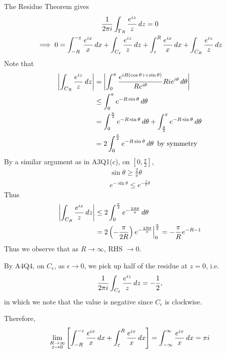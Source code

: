 \documentclass[11pt, oneside]{book}
\begin{document}
\begin{ex}
  The Residue Theorem gives
  \begin{gather*}
    \frac{1}{2 \pi i} \int_{\Gamma_R} \frac{e^{iz}}{z} \mathop{}\!d{z} = 0 \\
    \implies 0 = \int_{-R}^{-\varepsilon} \frac{e^{ix}}{x} \mathop{}\!d{x} + \int_{C_\varepsilon} \frac{e^{iz}}{z} \mathop{}\!d{z} + \int_{\varepsilon}^{R} \frac{e^{ix}}{x} \mathop{}\!d{x} + \int_{C_R} \frac{e^{iz}}{z} \mathop{}\!d{z} 
  \end{gather*}
  Note that
  \begin{align*}
    \left|\int_{C_R} \frac{e^{iz}}{z} \mathop{}\!d{z} \right|
      &= \left|\int_{0}^{\pi} \frac{e^{iR(\cos \theta + i \sin \theta)}}{Re^{i \theta}} Rie^{i \theta} \mathop{}\!d{\theta} \right| \\
      &\leq \int_{0}^{\pi} e^{-R \sin \theta} \mathop{}\!d{\theta}  \\
      &= \int_{0}^{\frac{\pi}{2}} e^{-R \sin \theta} \mathop{}\!d{\theta} + \int_{\frac{\pi}{2}}^{\pi} e^{-R \sin \theta} \mathop{}\!d{\theta} \\
      &= 2 \int_{0}^{\frac{\pi}{2}} e^{-R \sin \theta} \mathop{}\!d{\theta} \enspace \text{by symmetry} 
  \end{align*}
  By a similar argument as in A3Q1(c), on $[0, \frac{\pi}{2} ]$,
  \begin{gather*}
    \sin \theta \geq \frac{2}{\pi} \theta \\
    e^{- \sin \theta} \leq e^{- \frac{2}{\pi} \theta}
  \end{gather*}
  Thus
  \begin{align*}
    \left|\int_{C_R} \frac{e^{iz}}{z} \mathop{}\!d{z} \right|
      &\leq 2 \int_{0}^{\frac{\pi}{2}} e^{-\frac{2R \theta}{\pi}} \mathop{}\!d{\theta} \\
      &= 2 \left( -\frac{\pi}{2R} \right) e^{-\frac{2R \theta}{\pi} }\Big|_{0}^{\frac{\pi}{2}} = -\frac{\pi}{R} e^{-R - 1}
  \end{align*}
  Thus we observe that as $R \to \infty$, RHS $\to 0$.

  By A4Q4, on $C_\epsilon$, as $\epsilon \to 0$, we pick up half of the residue at $z = 0$, i.e.
  \begin{equation*}
    \frac{1}{2 \pi i} \int_{C_\varepsilon} \frac{e^{iz}}{z} \mathop{}\!d{z} = - \frac{1}{2},
  \end{equation*}
  in which we note that the value is negative since $C_\epsilon$ is clockwise.

  Therefore,
  \begin{equation*}
    \lim_{\substack{R \to \infty \\ \varepsilon \to 0}} \left[ \int_{-R}^{-\varepsilon} \frac{e^{ix}}{x} \mathop{}\!d{x} + \int_{\varepsilon}^{R} \frac{e^{ix}}{x} \mathop{}\!d{x} \right] = \int_{-\infty}^{\infty} \frac{e^{ix}}{x} \mathop{}\!d{x} = \pi i
  \end{equation*}


\end{ex}
\end{document}
